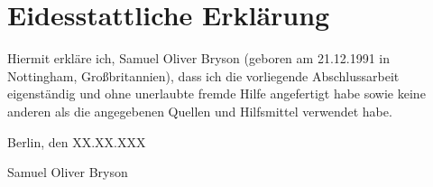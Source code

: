 \section*{Eidesstattliche Erkl\"arung}

Hiermit erkl\"are ich, Samuel Oliver Bryson (geboren am 21.12.1991 in Nottingham, Gro\ss{}britannien), dass ich die vorliegende Abschlussarbeit eigenst\"andig und ohne unerlaubte fremde Hilfe angefertigt habe sowie keine anderen als die angegebenen Quellen und Hilfsmittel verwendet habe.

\vspace{2cm}

\begin{flushright}
	Berlin, den XX.XX.XXX \hspace{1cm} \underline{\hspace{7cm}}

	Samuel Oliver Bryson \hspace{1.5cm} \par
\end{flushright}
